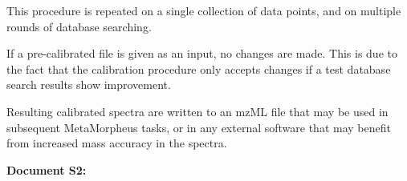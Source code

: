 \documentclass{article}
\begin{document}
This procedure is repeated on a single collection of data points, and on multiple rounds of database searching. 

If a pre-calibrated file is given as an input, no changes are made. This is due to the fact that the calibration procedure only accepts changes if a test database search results show improvement.

Resulting calibrated spectra are written to an mzML file that may be used in subsequent MetaMorpheus tasks, or in any external software that may benefit from increased mass accuracy in the spectra.

\newpage

{\huge \textbf{Document S2:} }
\end{document}
